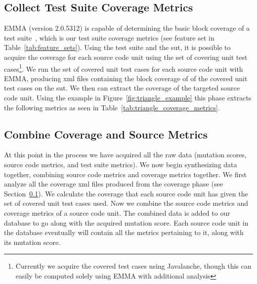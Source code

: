 \subsection{Collect Test Suite Coverage Metrics}
\label{subsec:approach_collect_coverage_metrics}
EMMA (version 2.0.5312) is capable of determining the basic block coverage of a test suite~\cite{EMMA}, which is our test suite coverage metrics (see feature set  in Table~\ref{tab:feature_sets}). Using the test suite and the \gls{sut}, it is possible to acquire the coverage for each source code unit using the set of covering unit test cases\footnote{Currently we acquire the covered test cases using Javalanche, though this can easily be computed solely using EMMA with additional analysis}. We run the set of covered unit test cases for each source code unit with EMMA, producing \gls{xml} files containing the block coverage of of the covered unit test cases on the \gls{sut}. We then can extract the coverage of the targeted source code unit. Using the example in Figure~\ref{fig:triangle_example} this phase extracts the following metrics as seen in Table~\ref{tab:triangle_coverage_metrics}.


\subsection{Combine Coverage and Source Metrics}
\label{subsec:approach_combine_metrics}
At this point in the process we have acquired all the raw data (mutation scores, source code metrics, and test suite metrics). We now begin synthesizing data together, combining source code metrics and coverage metrics together. We first analyze all the coverage \gls{xml} files produced from the coverage phase (see Section~\ref{subsec:approach_collect_coverage_metrics}). We calculate the coverage that each source code unit has given the set of covered unit test cases used. Now we combine the source code metrics and coverage metrics of a source code unit. The combined data is added to our database to go along with the acquired mutation score. Each source code unit in the database eventually will contain all the metrics pertaining to it, along with its mutation score.

